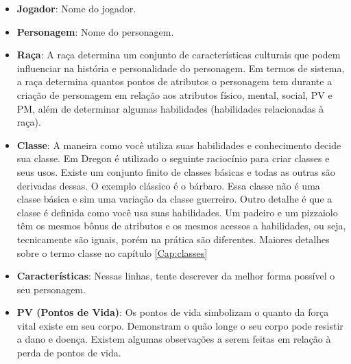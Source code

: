 \begin{itemize}
	\item \textbf{Jogador}: Nome do jogador.
	\item \textbf{Personagem}: Nome do personagem.
  	\item \textbf{Raça}: A raça determina um conjunto de características culturais que podem influenciar na história e personalidade do personagem. Em termos de sistema, a raça determina quantos pontos de atributos o personagem tem durante a criação de personagem em relação aos atributos físico, mental, social, PV e PM, além de determinar algumas habilidades (habilidades relacionadas à raça). 
  \item \textbf{Classe}: A maneira como você utiliza suas habilidades e conhecimento decide sua classe. Em Dregon é utilizado o seguinte raciocínio para criar classes e seus usos. Existe um conjunto finito de classes básicas e todas as outras são derivadas dessas. O exemplo clássico é o bárbaro. Essa classe não é uma classe básica e sim uma variação da classe guerreiro. Outro detalhe é que a classe é definida como você usa suas habilidades. Um padeiro e um pizzaiolo têm os mesmos bônus de atributos e os mesmos acessos a habilidades, ou seja, tecnicamente são iguais, porém na prática são diferentes. Maiores detalhes sobre o termo classe no capítulo \ref{Cap:classes}

  \item \textbf{Características}: Nessas linhas, tente descrever da melhor forma possível o seu personagem. 
  \item \textbf{PV (Pontos de Vida)}: Os pontos de vida simbolizam o quanto da força vital existe em seu corpo. Demonstram o quão longe o seu corpo pode resistir a dano e doença. Existem algumas observações a serem feitas em relação à perda de pontos de vida.


\end{itemize}
